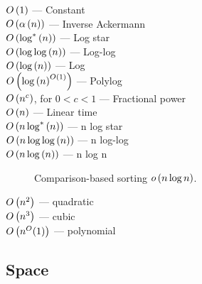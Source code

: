 \begin{description}

\item[$O\left({1}\right)$ --- Constant]

\item[$O\left({\alpha\left({n}\right)}\right)$ --- Inverse Ackermann]

\item[$O\left({\log^*{\left({n}\right)}}\right)$ --- Log star]

\item[$O\left({\log{\log{\ensuremath{\left({n}\right)}}}}\right)$ --- Log-log]

\item[$O\left({\log{\ensuremath{\left({n}\right)}}}\right)$ --- Log]

\item[$O\left({\log{\ensuremath{\left({n}\right)}^{\ensuremath{O\left({1}\right)}}}}\right)$ --- Polylog]

\item[$O\left({n^c}\right)$, for $0<c<1$ --- Fractional power]

\item[$O\left({n}\right)$ --- Linear time]

\item[$O\left({n\log^*{\left({n}\right)}}\right)$ --- n log star]

\item[$O\left({n\log{\log{\ensuremath{\left({n}\right)}}}}\right)$ --- n log-log]

\item[$O\left({n\log{\ensuremath{\left({n}\right)}}}\right)$ --- n log n]

Comparison-based sorting $o\left({n\log{n}}\right)$.

\item[$O\left({n^2}\right)$ --- quadratic]

\item[$O\left({n^3}\right)$ --- cubic]

\item[$O\left({n^O(1)}\right)$ --- polynomial]

\end{description}

\subsection{Space}
